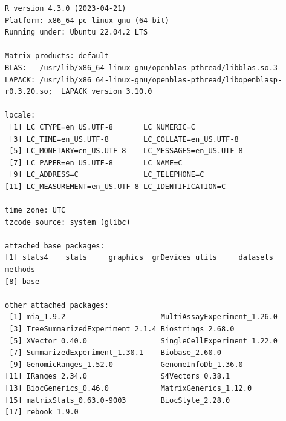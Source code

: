 \documentclass[
]{book}
\begin{document}
\begin{verbatim}
R version 4.3.0 (2023-04-21)
Platform: x86_64-pc-linux-gnu (64-bit)
Running under: Ubuntu 22.04.2 LTS

Matrix products: default
BLAS:   /usr/lib/x86_64-linux-gnu/openblas-pthread/libblas.so.3 
LAPACK: /usr/lib/x86_64-linux-gnu/openblas-pthread/libopenblasp-r0.3.20.so;  LAPACK version 3.10.0

locale:
 [1] LC_CTYPE=en_US.UTF-8       LC_NUMERIC=C              
 [3] LC_TIME=en_US.UTF-8        LC_COLLATE=en_US.UTF-8    
 [5] LC_MONETARY=en_US.UTF-8    LC_MESSAGES=en_US.UTF-8   
 [7] LC_PAPER=en_US.UTF-8       LC_NAME=C                 
 [9] LC_ADDRESS=C               LC_TELEPHONE=C            
[11] LC_MEASUREMENT=en_US.UTF-8 LC_IDENTIFICATION=C       

time zone: UTC
tzcode source: system (glibc)

attached base packages:
[1] stats4    stats     graphics  grDevices utils     datasets  methods  
[8] base     

other attached packages:
 [1] mia_1.9.2                      MultiAssayExperiment_1.26.0   
 [3] TreeSummarizedExperiment_2.1.4 Biostrings_2.68.0             
 [5] XVector_0.40.0                 SingleCellExperiment_1.22.0   
 [7] SummarizedExperiment_1.30.1    Biobase_2.60.0                
 [9] GenomicRanges_1.52.0           GenomeInfoDb_1.36.0           
[11] IRanges_2.34.0                 S4Vectors_0.38.1              
[13] BiocGenerics_0.46.0            MatrixGenerics_1.12.0         
[15] matrixStats_0.63.0-9003        BiocStyle_2.28.0              
[17] rebook_1.9.0                  


\end{verbatim}
\end{document}
